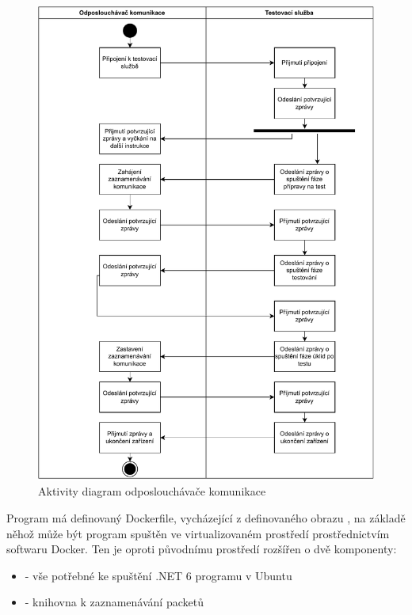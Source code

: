 \begin{figure}[htbp]
    \centering 
    \includegraphics[width=\textwidth]{assets/img/activity_networklogger.pdf}
    \caption{Aktivity diagram odposlouchávače komunikace}
    \label{fig:logger_activity}
\end{figure}

Program má definovaný Dockerfile, vycházející z definovaného obrazu , na základě něhož může být program spuštěn ve virtualizovaném prostředí prostřednictvím softwaru Docker. Ten je oproti původnímu prostředí rozšířen o dvě komponenty:

\begin{itemize}
    \item {} - vše potřebné ke spuštění .NET 6 programu v Ubuntu
    \item {} - knihovna k zaznamenávání packetů 
\end{itemize}

